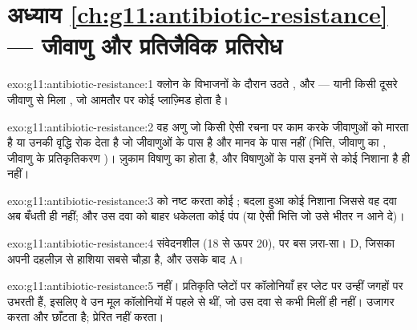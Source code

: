 \section*{अध्याय \ref{ch:g11:antibiotic-resistance} --- जीवाणु और प्रतिजैविक प्रतिरोध}

\begin{solution}{exo:g11:antibiotic-resistance:1}
क्लोन के विभाजनों के दौरान उठते , और  --- यानी
किसी दूसरे जीवाणु से मिला , जो आमतौर पर कोई प्लाज़्मिड होता है।
\end{solution}

\begin{solution}{exo:g11:antibiotic-resistance:2}
वह अणु जो किसी ऐसी रचना पर काम करके जीवाणुओं को मारता है या उनकी वृद्धि
रोक देता है जो जीवाणुओं के पास है और मानव  के पास नहीं (भित्ति,
जीवाणु का , जीवाणु के प्रतिकृतिकरण )। ज़ुकाम विषाणु का होता
है, और विषाणुओं के पास इनमें से कोई निशाना है ही नहीं।
\end{solution}

\begin{solution}{exo:g11:antibiotic-resistance:3}
 को नष्ट करता कोई ; बदला हुआ कोई निशाना जिससे वह दवा अब
बँधती ही नहीं; और उस दवा को बाहर धकेलता कोई पंप (या ऐसी भित्ति जो उसे भीतर
न आने दे)।
\end{solution}

\begin{solution}{exo:g11:antibiotic-resistance:4}
संवेदनशील (18 से ऊपर 20), पर बस ज़रा-सा। D, जिसका अपनी दहलीज़ से हाशिया
सबसे चौड़ा है, और उसके बाद A।
\end{solution}

\begin{solution}{exo:g11:antibiotic-resistance:5}
नहीं। प्रतिकृति प्लेटों पर  कॉलोनियाँ हर  प्लेट पर
उन्हीं जगहों पर उभरती हैं, इसलिए वे   उन मूल कॉलोनियों में
पहले से थीं, जो उस दवा से कभी मिलीं ही नहीं।  उजागर करता और
छाँटता है; प्रेरित नहीं करता।
\end{solution}


